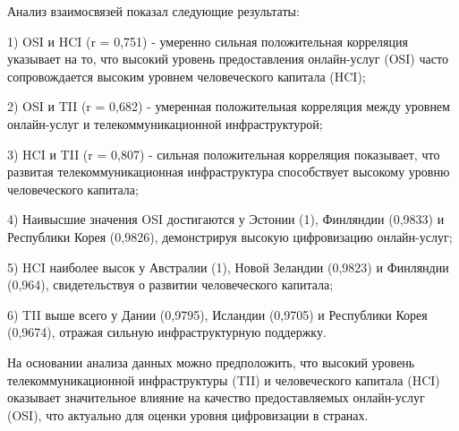 {%

Анализ взаимосвязей показал следующие результаты:

1) OSI и HCI (r = 0,751) - умеренно сильная положительная корреляция
указывает на то, что высокий уровень предоставления онлайн-услуг (OSI)
часто сопровождается высоким уровнем человеческого капитала (HCI);

2) OSI и TII (r = 0,682) - умеренная положительная корреляция между
уровнем онлайн-услуг и телекоммуникационной инфраструктурой;

3) HCI и TII (r = 0,807) - сильная положительная корреляция показывает,
что развитая телекоммуникационная инфраструктура способствует высокому
уровню человеческого капитала;

4) Наивысшие значения OSI достигаются у Эстонии (1), Финляндии (0,9833)
и Республики Корея (0,9826), демонстрируя высокую цифровизацию
онлайн-услуг;

5) HCI наиболее высок у Австралии (1), Новой Зеландии (0,9823) и
Финляндии (0,964), свидетельствуя о развитии человеческого капитала;

6) TII выше всего у Дании (0,9795), Исландии (0,9705) и Республики Корея
(0,9674), отражая сильную инфраструктурную поддержку.

На основании анализа данных можно предположить, что высокий уровень
телекоммуникационной инфраструктуры (TII) и человеческого капитала (HCI)
оказывает значительное влияние на качество предоставляемых онлайн-услуг
(OSI), что актуально для оценки уровня цифровизации в странах.

}
